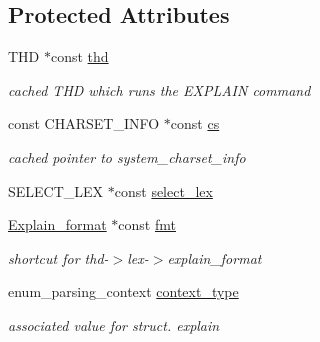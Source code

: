 \subsection*{Protected Attributes}
\begin{DoxyCompactItemize}
\item 
\mbox{\label{classExplain_adeea4fbe8c79fda7359432fbbed1506b}} 
T\+HD $\ast$const \mbox{\hyperlink{classExplain_adeea4fbe8c79fda7359432fbbed1506b}{thd}}
\begin{DoxyCompactList}\small\item\em cached T\+HD which runs the E\+X\+P\+L\+A\+IN command \end{DoxyCompactList}\item 
\mbox{\label{classExplain_a01ca2be54166015aad2d40cbe84450f3}} 
const C\+H\+A\+R\+S\+E\+T\+\_\+\+I\+N\+FO $\ast$const \mbox{\hyperlink{classExplain_a01ca2be54166015aad2d40cbe84450f3}{cs}}
\begin{DoxyCompactList}\small\item\em cached pointer to system\+\_\+charset\+\_\+info \end{DoxyCompactList}\item 
S\+E\+L\+E\+C\+T\+\_\+\+L\+EX $\ast$const \mbox{\hyperlink{classExplain_ad66987d49df1e5712c2af2f646561503}{select\+\_\+lex}}
\item 
\mbox{\label{classExplain_ab4fb50c193733374ba5286e26e8b3083}} 
\mbox{\hyperlink{classExplain__format}{Explain\+\_\+format}} $\ast$const \mbox{\hyperlink{classExplain_ab4fb50c193733374ba5286e26e8b3083}{fmt}}
\begin{DoxyCompactList}\small\item\em shortcut for thd-\/$>$lex-\/$>$explain\+\_\+format \end{DoxyCompactList}\item 
\mbox{\label{classExplain_a4958f940e980db6c346c5b4f6dbe1341}} 
enum\+\_\+parsing\+\_\+context \mbox{\hyperlink{classExplain_a4958f940e980db6c346c5b4f6dbe1341}{context\+\_\+type}}
\begin{DoxyCompactList}\small\item\em associated value for struct. explain \end{DoxyCompactList}\item 
\mbox{\label{classExplain_a82528ca908546d506b6b50dcc5aae6ac}} 

\end{DoxyCompactItemize}
